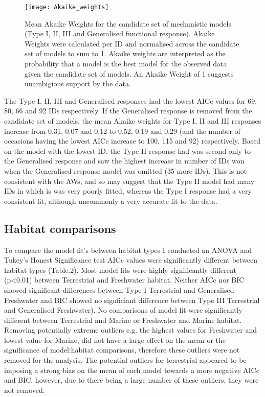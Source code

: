 \documentclass[11pt]{article}
\begin{document}
            \begin{figure}[htpb]
                \texttt{[image: Akaike\_weights]}\label{fig:3}
                \centering
                \caption{Mean Akaike Weights for the candidate set of mechanistic models (Type I, II, III and Generalised functional response). Akaike Weights were calculated per ID and normalised across the candidate set of models to sum to 1. Akaike weights are interpreted as the probability that a model is the best model for the observed data given the candidate set of models. An Akaike Weight of 1 suggests unambigious support by the data.}
            \end{figure}

            The Type I, II, III and Generalised responses had the lowest AICc values for 69, 80, 66 and 92 IDs respectively. If the Generalised response is removed from the candidate set of models, the mean Akaike weights for Type I, II and III responses increase from 0.31, 0.07 and 0.12 to 0.52, 0.19 and 0.29 (and the number of occasions having the lowest AICc increase to 100, 115 and 92) respectively. Based on the model with the lowest ID, the Type II response had was second only to the Generalised response and saw the highest increase in number of IDs won when the Generalised response model was omitted (35 more IDs). This is not consistent with the AWs, and so may suggest that the Type II model had many IDs in which is was very poorly fitted, whereas the Type I response had a very consistent fit, although uncommonly a very accurate fit to the data.

        \subsection{Habitat comparisons}
            To compare the model fit's between habitat types I conducted an ANOVA and Tukey's Honest Significance test AICc values were significantly different between habitat types (Table.2). Most model fits were highly significantly different (p\textless0.01) between Terrestrial and Freshwater habitat. Neither AICc nor BIC showed significant differences between Type I Terrestrial and Generalised Freshwater and BIC showed  no signficiant difference between Type III Terrestrial and Generalised Freshwater). No comparisons of model fit were significantly different between Terrestrial and Marine or Freshwater and Marine habitat. Removing potentially extreme outliers e.g. the highest values for Freshwater and lowest value for Marine, did not have a large effect on the mean or the significance of model:habitat comparisons, therefore these outliers were not removed for the analysis. The potential outliers for terrestrial appeared to be imposing a strong bias on the mean of each model towards a more negative AICc and BIC, however, due to there being a large number of these outliers, they were not removed.
\end{document}
